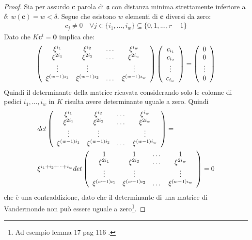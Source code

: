 \begin{proof}
    Sia per assurdo $\mathbf{c}$ parola di $\mathfrak{a}$ con distanza minima strettamente inferiore a $\delta$: $w(\mathbf{c})= w < \delta$. Segue che esistono $w$ elementi di $\mathbf{c}$ diversi da zero:
    \begin{align*}
       c_{j} \neq 0 \quad \forall j \in \lbrace i_{1}, \dots, i_{w} \rbrace \subseteq \lbrace 0, 1 , \dots, r-1 \rbrace
    \end{align*}
    Dato che $K \mathbf{c}^{t} = \mathbf{0}$ implica che:
    \begin{align*}
 	\left(
 	\begin{array} {c c c c}
 	\xi^{i_1} & \xi^{i_2} & \dots & \xi^{i_w}   \\
        \xi^{2i_1}  & \xi^{2i_2} & \dots & \xi^{2i_w}   \\
        \vdots &   \vdots  &  & \vdots   \\
        \xi^{(w - 1 )i_1}&\xi^{(w-1)i_2} & \dots & \xi^{(w -1)i_w}
 	\end{array}
 	\right)
 	\left(
 	\begin{array} {c}
 	c_{i_{1}} \\
 	c_{i_{2}}\\
 	\vdots \\
 	c_{i_{w}}
 	\end{array}
 	\right)
 	=
 	\left(
 	\begin{array} {c}
 	0 \\
 	0\\
 	\vdots \\
 	0
 	\end{array}
 	\right)
     \end{align*}
    Quindi il determinante della matrice ricavata considerando solo le colonne di pedici $i_{1}, \dots, i_{w}$ in $K$ risulta avere determinante uguale a zero. Quindi
    \begin{align*}
       & det
 	\left(
 	\begin{array} {c c c c}
 	\xi^{i_1} & \xi^{i_2} & \dots & \xi^{i_w}   \\
        \xi^{2i_1}  & \xi^{2i_2} & \dots & \xi^{2i_w}   \\
        \vdots &   \vdots  &  & \vdots   \\
        \xi^{(w - 1 )i_1}&\xi^{(w-1)i_2} & \dots & \xi^{(w -1)i_w}
 	\end{array}
 	\right)
 	= \\
 	& \xi^{i_1 + i_2 + \dots + i_w }
 	det
 	\left(
 	\begin{array} {c c c c}
 	1 &  1 & \dots & 1   \\
        \xi^{2i_1} & \xi^{2i_2} & \dots & \xi^{2i_w}   \\
        \vdots &  \vdots  &  & \vdots   \\
        \xi^{(w - 1 )i_1}& \xi^{(w-1)i_2} & \dots & \xi^{(w-1)i_w}
 	\end{array}
 	\right)
 	= 0
    \end{align*}
    che è una contraddizione, dato che il determinante di una matrice di Vandermonde non può essere uguale a zero\footnote{Ad esempio lemma $17$ pag $116$ \cite{sloane}.}.
\end{proof}

